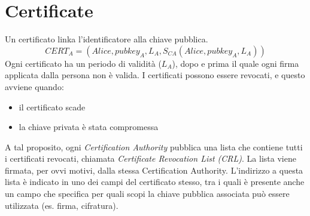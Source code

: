 \documentclass[a4paper,12pt]{article}
\begin{document}
\newpage

\section{Certificate}
Un certificato linka l'identificatore alla chiave pubblica.
$$ CERT_A = (Alice, pubkey_A, L_A, S_{CA}(Alice, pubkey_A, L_A))$$
Ogni certificato ha un periodo di validità ($L_A$), dopo e prima il quale ogni firma applicata dalla persona non è valida. 
I certificati possono essere revocati, e questo avviene quando:
\begin{itemize}
	\item il certificato scade
	\item la chiave privata è stata compromessa
\end{itemize}
A tal proposito, ogni \textit{Certification Authority} pubblica una lista che contiene tutti i certificati revocati, chiamata \textit{Certificate Revocation List (CRL)}.
La lista viene firmata, per ovvi motivi, dalla stessa Certification Authority. L'indirizzo a questa lista è indicato in uno dei campi del certificato stesso, tra i quali è presente anche un campo che specifica per quali scopi la chiave pubblica associata può essere utilizzata (es. firma, cifratura).
\end{document}
